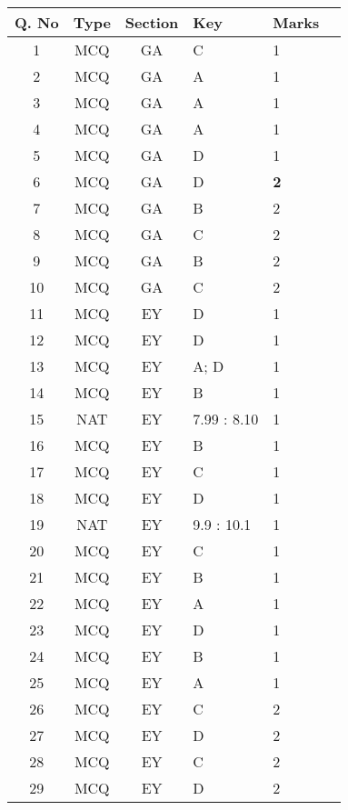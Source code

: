 \begin{table}[h!]
\small
\setlength{\tabcolsep}{4pt}
\renewcommand{\arraystretch}{0.9}
\centering
\begin{tabular}{|c|c|c|p{1.8cm}|p{2.5cm}|c|}
\hline
Q. No & Type & Section & Key & Marks \\
\hline
1  & MCQ & GA & C         & 1 \\
\hline
2  & MCQ & GA & A         & 1 \\
\hline
3  & MCQ & GA & A         & 1 \\
\hline
4  & MCQ & GA & A         & 1 \\
\hline
5  & MCQ & GA & D         & 1 \\
\hline
6  & MCQ & GA & D         & \textbf{2} \\
\hline
7  & MCQ & GA & B         & 2 \\
\hline
8  & MCQ & GA & C         & 2 \\
\hline
9  & MCQ & GA & B         & 2 \\
\hline
10 & MCQ & GA & C         & 2 \\
\hline
11 & MCQ & EY & D         & 1 \\
\hline
12 & MCQ & EY & D         & 1 \\
\hline
13 & MCQ & EY & A; D      & 1 \\
\hline
14 & MCQ & EY & B         & 1 \\
\hline
15 & NAT & EY & 7.99 : 8.10 & 1 \\
\hline
16 & MCQ & EY & B         & 1 \\
\hline
17 & MCQ & EY & C         & 1 \\
\hline
18 & MCQ & EY & D         & 1 \\
\hline
19 & NAT & EY & 9.9 : 10.1  & 1 \\
\hline
20 & MCQ & EY & C         & 1 \\
\hline
21 & MCQ & EY & B         & 1 \\
\hline
22 & MCQ & EY & A         & 1 \\
\hline
23 & MCQ & EY & D         & 1 \\
\hline
24 & MCQ & EY & B         & 1 \\
\hline
25 & MCQ & EY & A         & 1 \\
\hline
26 & MCQ & EY & C         & 2 \\
\hline
27 & MCQ & EY & D         & 2 \\
\hline
28 & MCQ & EY & C         & 2 \\
\hline
29 & MCQ & EY & D         & 2 \\

\end{tabular}
\end{table}
